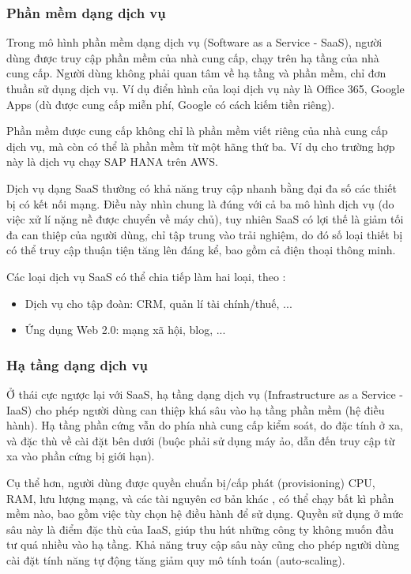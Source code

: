 \documentclass{article}
\begin{document}
\subsubsection{Phần mềm dạng dịch vụ}

Trong mô hình phần mềm dạng dịch vụ (Software as a Service - SaaS), người dùng
được truy cập phần mềm của nhà cung cấp, chạy trên hạ tầng của nhà cung cấp.
Người dùng không phải quan tâm về hạ tầng và phần mềm, chỉ đơn thuần sử dụng
dịch vụ. Ví dụ điển hình của loại dịch vụ này là Office 365, Google Apps (dù
được cung cấp miễn phí, Google có cách kiếm tiền riêng).

Phần mềm được cung cấp không chỉ là phần mềm viết riêng của nhà cung cấp dịch
vụ, mà còn có thể là phần mềm từ một hãng thứ ba. Ví dụ cho trường hợp này là
dịch vụ chạy SAP HANA trên AWS.

Dịch vụ dạng SaaS thường có khả năng truy cập nhanh bằng đại đa số các thiết bị
có kết nối mạng. Điều này nhìn chung là đúng với cả ba mô hình dịch vụ (do việc
xử lí nặng nề được chuyển về máy chủ), tuy nhiên SaaS có lợi thế là giảm tối đa
can thiệp của người dùng, chỉ tập trung vào trải nghiệm, do đó số loại thiết bị
có thể truy cập thuận tiện tăng lên đáng kể, bao gồm cả điện thoại thông minh.

Các loại dịch vụ SaaS có thể chia tiếp làm hai loại, theo \cite{MARINESCU201813}:

\begin{itemize}
    \item Dịch vụ cho tập đoàn: CRM, quản lí tài chính/thuế, ...
    \item Ứng dụng Web 2.0: mạng xã hội, blog, ...
\end{itemize}

\subsubsection{Hạ tầng dạng dịch vụ}

Ở thái cực ngược lại với SaaS, hạ tầng dạng dịch vụ (Infrastructure as a Service
- IaaS) cho phép người dùng can thiệp khá sâu vào hạ tầng phần mềm (hệ điều
hành). Hạ tầng phần cứng vẫn do phía nhà cung cấp kiểm soát, do đặc tính ở xa,
và đặc thù về cài đặt bên dưới (buộc phải sử dụng máy ảo, dẫn đến truy cập từ xa
vào phần cứng bị giới hạn).

Cụ thể hơn, người dùng được quyền chuẩn bị/cấp phát (provisioning) CPU, RAM, lưu
lượng mạng, và các tài nguyên cơ bản khác \cite{MARINESCU201813}, có thể chạy
bất kì phần mềm nào, bao gồm việc tùy chọn hệ điều hành để sử dụng. Quyền sử
dụng ở mức sâu này là điểm đặc thù của IaaS, giúp thu hút những công ty không
muốn đầu tư quá nhiều vào hạ tầng. Khả năng truy cập sâu này cũng cho phép người
dùng cài đặt tính năng tự động tăng giảm quy mô tính toán (auto-scaling).
\end{document}
